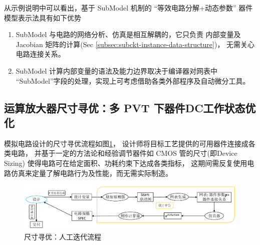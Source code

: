 从示例说明中可以看出，基于 SubModel 机制的 “等效电路分解+动态参数”
器件模型表示法具有如下优势
\begin{enumerate}[partopsep=0pt,topsep=0pt,itemsep=0pt,parsep=0pt]
  \item SubModel 与电路的网络分析、仿真是相互解耦的，它只负责
    内部变量及 Jacobian 矩阵的计算(Sec \ref{subsec:subckt-instance-data-structure})，
    无需关心电路连接关系。
  \item SubModel 计算内部变量的语法及能力边界取决于编译器对网表中
    “SubModel”字段的处理，实现上可考虑借助各类外部程序及自动微分工具。
\end{enumerate}
\subsection{运算放大器尺寸寻优：多 PVT 下器件DC工作状态优化}
模拟电路设计的尺寸寻优流程如图\ref{fig:manually-design}，
设计师将目标工艺提供的可用器件连接成各类电路，
并基于一定的方法论和经验调节器件如 CMOS 管的尺寸(即Device Sizing)
使得电路可在给定面积、功耗约束下达成各类指标，
这期间需反复使用电路仿真来定量了解电路行为及性能，而无需实际制造。
\begin{figure}[htpb]
  \centering
  \includegraphics[width=\textwidth]{fig/manually-design.pdf}
  \caption{尺寸寻优：人工迭代流程}
  \label{fig:manually-design}
\end{figure}

